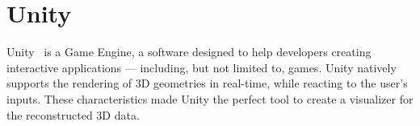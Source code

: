 \section{Unity}

Unity~\cite{unity} is a Game Engine, a software designed to help developers creating interactive applications --- including, but not limited to, games.
Unity natively supports the rendering of 3D geometries in real-time, while reacting to the user's inputs.
These characteristics made Unity the perfect tool to create a visualizer for the reconstructed 3D data.

